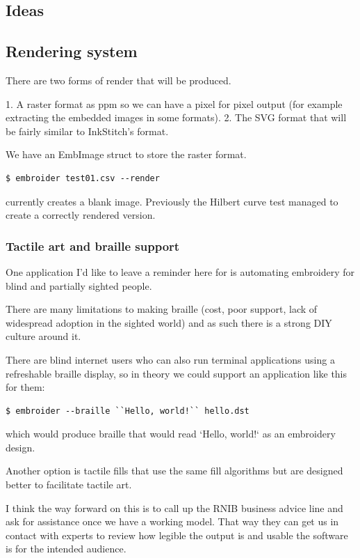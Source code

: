 \documentclass[a4paper]{report}
\begin{document}
\subsection{Ideas}

\subsection{Rendering system}

There are two forms of render that will be produced.

1. A raster format as ppm so we can have a pixel for pixel output (for example extracting the embedded images in some formats).
2. The SVG format that will be fairly similar to InkStitch's format.

We have an EmbImage struct to store the raster format.

\begin{lstlisting}
$ embroider test01.csv --render
\end{lstlisting}

currently creates a blank image. Previously the Hilbert curve test managed to
create a correctly rendered version.

\subsubsection{Tactile art and braille support}

One application I'd like to leave a reminder here for is automating embroidery
for blind and partially sighted people.

There are many limitations to making braille (cost, poor support, lack of
widespread adoption in the sighted world) and as such there is a strong DIY
culture around it.

There are blind internet users who can also run terminal applications using a
refreshable braille display, so in theory we could support an application like
this for them:

\begin{lstlisting}
$ embroider --braille ``Hello, world!`` hello.dst
\end{lstlisting}

which would produce braille that would read `Hello, world!` as an embroidery design.

Another option is tactile fills that use the same fill algorithms but are
designed better to facilitate tactile art.

I think the way forward on this is to call up the RNIB business advice line and ask for assistance once we have a working model. That way they can get us in contact with experts to review how legible the output is and usable the software is for the intended audience.
\end{document}
